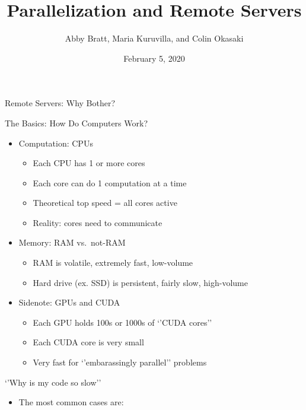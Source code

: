 \documentclass[ignorenonframetext,]{beamer}
\title{Parallelization and Remote Servers}
\author{Abby Bratt, Maria Kuruvilla, and Colin Okasaki}
\date{February 5, 2020}
\providecommand{\tightlist}{%
  \setlength{\itemsep}{0pt}\setlength{\parskip}{0pt}}
\begin{document}
\frame{\titlepage}

\begin{frame}

\end{frame}

\begin{frame}{Remote Servers: Why Bother?}

\begin{block}{The Basics: How Do Computers Work?}

\begin{itemize}[<+->]
\tightlist
\item
  Computation: CPUs

  \begin{itemize}[<+->]
  \tightlist
  \item
    Each CPU has 1 or more cores
  \item
    Each core can do 1 computation at a time
  \item
    Theoretical top speed = all cores active
  \item
    Reality: cores need to communicate
  \end{itemize}
\item
  Memory: RAM vs.~not-RAM

  \begin{itemize}[<+->]
  \tightlist
  \item
    RAM is volatile, extremely fast, low-volume
  \item
    Hard drive (ex. SSD) is persistent, fairly slow, high-volume
  \end{itemize}
\item
  Sidenote: GPUs and CUDA

  \begin{itemize}[<+->]
  \tightlist
  \item
    Each GPU holds 100s or 1000s of `'CUDA cores''
  \item
    Each CUDA core is very small
  \item
    Very fast for `'embarassingly parallel'' problems
  \end{itemize}
\end{itemize}

\end{block}

\begin{block}{`'Why is my code so slow''}

\begin{itemize}[<+->]
\tightlist
\item
  The most common cases are:


\end{itemize}
\end{block}
\end{frame}
\end{document}
